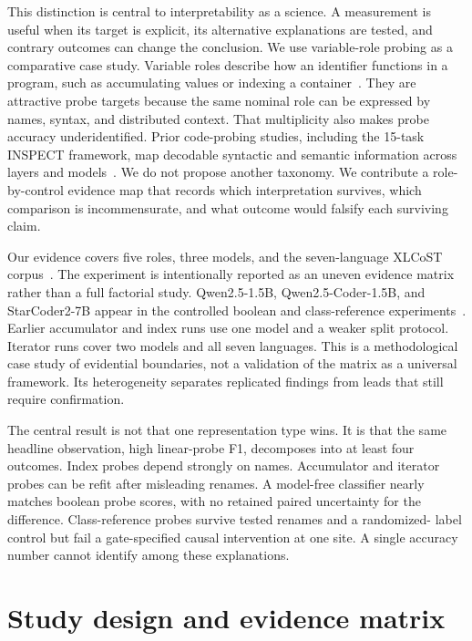 \documentclass{article}
\begin{document}
This distinction is central to interpretability as a science. A measurement is
useful when its target is explicit, its alternative explanations are tested,
and contrary outcomes can change the conclusion. We use variable-role probing
as a comparative case study. Variable roles describe how an identifier
functions in a program, such as accumulating values or indexing a
container~\citep{sajaniemi2002roles}. They are attractive probe targets because
the same nominal role can be expressed by names, syntax, and distributed
context. That multiplicity also makes probe accuracy underidentified.
Prior code-probing studies, including the 15-task INSPECT framework, map
decodable syntactic and semantic information across layers and
models~\citep{karmakar2021what,troshin2022probing,karmakar2024inspect}. We do
not propose another taxonomy. We contribute a role-by-control evidence map that
records which interpretation survives, which comparison is incommensurate, and
what outcome would falsify each surviving claim.

Our evidence covers five roles, three models, and the seven-language XLCoST
corpus~\citep{zhu2022xlcost}. The experiment is intentionally reported as an
uneven evidence matrix rather than a full factorial study. Qwen2.5-1.5B,
Qwen2.5-Coder-1.5B, and StarCoder2-7B appear in the controlled boolean and
class-reference experiments~\citep{qwen2024qwen25,hui2024qwencoder,
lozhkov2024starcoder2}. Earlier accumulator and index runs use one model and a
weaker split protocol. Iterator runs cover two models and all seven languages.
This is a methodological case study of evidential boundaries, not a validation
of the matrix as a universal framework. Its heterogeneity separates replicated
findings from leads that still require confirmation.

The central result is not that one representation type wins. It is that the
same headline observation, high linear-probe F1, decomposes into at least four
outcomes. Index probes depend strongly on names. Accumulator and iterator
probes can be refit after misleading renames. A model-free classifier nearly
matches boolean probe scores, with no retained paired uncertainty for the
difference. Class-reference probes survive tested renames and a randomized-
label control but fail a gate-specified causal intervention at one site. A
single accuracy number cannot identify among these explanations.

\section{Study design and evidence matrix}
\end{document}
